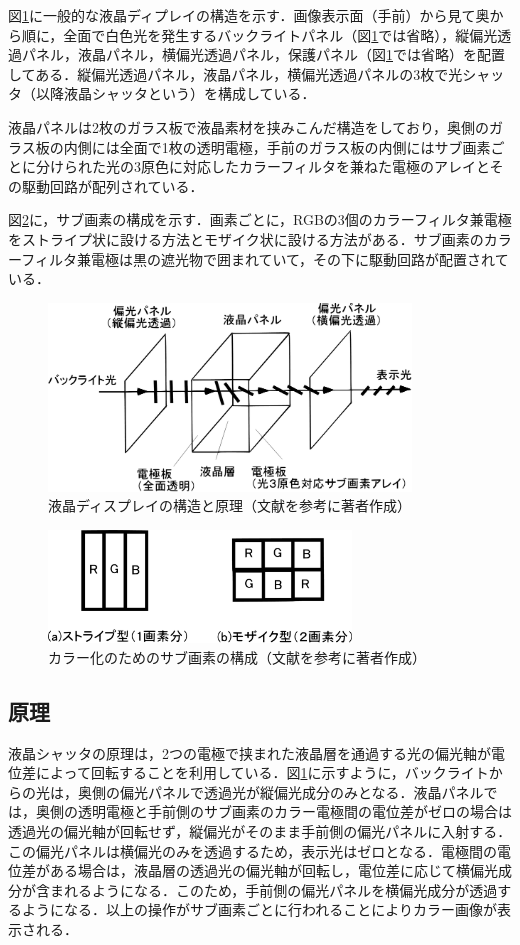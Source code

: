\documentclass[dvipdfmx,uplatex]{jsarticle}
\begin{document}
図\ref{FIG.MEC}に一般的な液晶ディプレイの構造を示す．画像表示面（手前）から見て奥から順に，全面で白色光を発生するバックライトパネル（図\ref{FIG.MEC}では省略），縦偏光透過パネル，液晶パネル，横偏光透過パネル，保護パネル（図\ref{FIG.MEC}では省略）を配置してある．縦偏光透過パネル，液晶パネル，横偏光透過パネルの3枚で光シャッタ（以降液晶シャッタという）を構成している．

液晶パネルは2枚のガラス板で液晶素材を挟みこんだ構造をしており，奥側のガラス板の内側には全面で1枚の透明電極，手前のガラス板の内側にはサブ画素ごとに分けられた光の3原色に対応したカラーフィルタを兼ねた電極のアレイとその駆動回路が配列されている．

図\ref{FIG.SUBPIXL}に，サブ画素の構成を示す．画素ごとに，RGBの3個のカラーフィルタ兼電極をストライプ状に設ける方法とモザイク状に設ける方法がある．サブ画素のカラーフィルタ兼電極は黒の遮光物で囲まれていて，その下に駆動回路が配置されている．

\begin{figure}[ht]
	\centering
	\includegraphics[height=5cm]{fig/uOSGYA.pdf}
	\caption{液晶ディスプレイの構造と原理（文献\cite{NAEMURA}を参考に著者作成）}\label{FIG.MEC}
\end{figure}

\begin{figure}[ht]
	\centering
	\includegraphics[height=3cm]{fig/wfhA7I.pdf}
	\caption{カラー化のためのサブ画素の構成（文献\cite{SATO}を参考に著者作成）}\label{FIG.SUBPIXL}
\end{figure}

\subsection{原理}
液晶シャッタの原理は，2つの電極で挟まれた液晶層を通過する光の偏光軸が電位差によって回転することを利用している．図\ref{FIG.MEC}に示すように，バックライトからの光は，奥側の偏光パネルで透過光が縦偏光成分のみとなる．液晶パネルでは，奥側の透明電極と手前側のサブ画素のカラー電極間の電位差がゼロの場合は透過光の偏光軸が回転せず，縦偏光がそのまま手前側の偏光パネルに入射する．この偏光パネルは横偏光のみを透過するため，表示光はゼロとなる．電極間の電位差がある場合は，液晶層の透過光の偏光軸が回転し，電位差に応じて横偏光成分が含まれるようになる．このため，手前側の偏光パネルを横偏光成分が透過するようになる．以上の操作がサブ画素ごとに行われることによりカラー画像が表示される．
\end{document}
